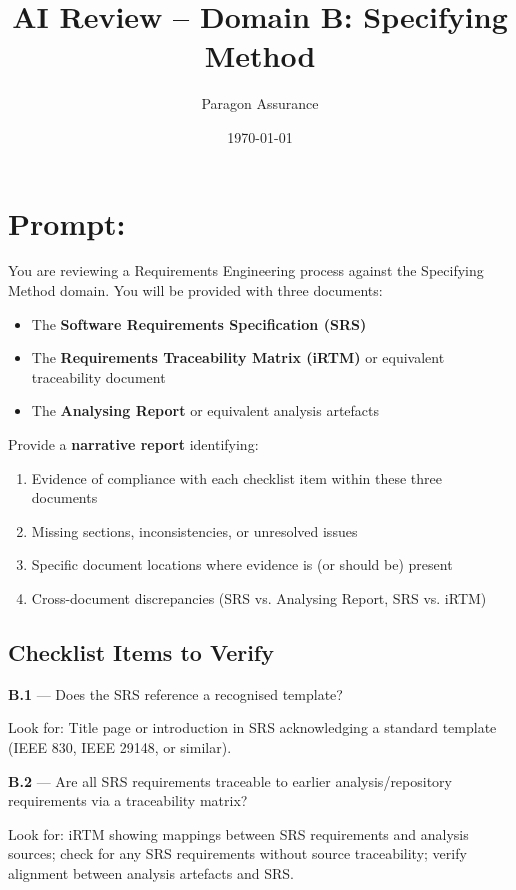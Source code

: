 \documentclass[11pt,a4paper]{article}
\title{AI Review -- Domain B: Specifying Method}
\author{Paragon Assurance}
\date{\today}
\begin{document}
\maketitle

\section*{Prompt:}

You are reviewing a Requirements Engineering process against the Specifying Method domain. You will be provided with three documents:

\begin{itemize}
\item The \textbf{Software Requirements Specification (SRS)}
\item The \textbf{Requirements Traceability Matrix (iRTM)} or equivalent traceability document
\item The \textbf{Analysing Report} or equivalent analysis artefacts
\end{itemize}

Provide a \textbf{narrative report} identifying:

\begin{enumerate}
\item Evidence of compliance with each checklist item within these three documents
\item Missing sections, inconsistencies, or unresolved issues
\item Specific document locations where evidence is (or should be) present
\item Cross-document discrepancies (SRS vs. Analysing Report, SRS vs. iRTM)
\end{enumerate}

\subsection*{Checklist Items to Verify}

\textbf{B.1} --- Does the SRS reference a recognised template?

Look for: Title page or introduction in SRS acknowledging a standard template (IEEE 830, IEEE 29148, or similar).

\textbf{B.2} --- Are all SRS requirements traceable to earlier analysis/repository requirements via a traceability matrix?

Look for: iRTM showing mappings between SRS requirements and analysis sources; check for any SRS requirements without source traceability; verify alignment between analysis artefacts and SRS.
\end{document}
